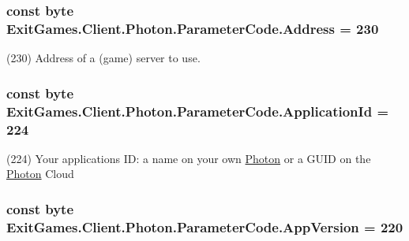 \subsubsection[{\texorpdfstring{Address}{Address}}]{\setlength{\rightskip}{0pt plus 5cm}const byte Exit\+Games.\+Client.\+Photon.\+Parameter\+Code.\+Address = 230}\hypertarget{class_exit_games_1_1_client_1_1_photon_1_1_parameter_code_acf4cf60ff38fc481c7b1a9becd0d42c5}{}\label{class_exit_games_1_1_client_1_1_photon_1_1_parameter_code_acf4cf60ff38fc481c7b1a9becd0d42c5}


(230) Address of a (game) server to use.

\subsubsection[{\texorpdfstring{Application\+Id}{ApplicationId}}]{\setlength{\rightskip}{0pt plus 5cm}const byte Exit\+Games.\+Client.\+Photon.\+Parameter\+Code.\+Application\+Id = 224}\hypertarget{class_exit_games_1_1_client_1_1_photon_1_1_parameter_code_a705a32c44b18fe1c8d700c90ecbd03df}{}\label{class_exit_games_1_1_client_1_1_photon_1_1_parameter_code_a705a32c44b18fe1c8d700c90ecbd03df}


(224) Your application\textquotesingle{}s ID\+: a name on your own \hyperlink{namespace_exit_games_1_1_client_1_1_photon}{Photon} or a G\+U\+ID on the \hyperlink{namespace_exit_games_1_1_client_1_1_photon}{Photon} Cloud

\subsubsection[{\texorpdfstring{App\+Version}{AppVersion}}]{\setlength{\rightskip}{0pt plus 5cm}const byte Exit\+Games.\+Client.\+Photon.\+Parameter\+Code.\+App\+Version = 220}\hypertarget{class_exit_games_1_1_client_1_1_photon_1_1_parameter_code_ad3fdb932852194ba542b5524c4487722}{}\label{class_exit_games_1_1_client_1_1_photon_1_1_parameter_code_ad3fdb932852194ba542b5524c4487722}


